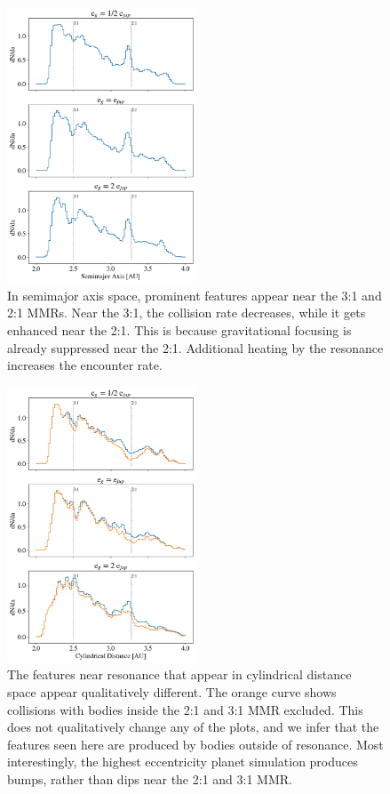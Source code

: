 \documentclass[onecolumn]{aastex63}
\begin{document}
\begin{figure}
\begin{center}
    \includegraphics[width=0.5\textwidth]{figures/coll_hist_a.png}
    \caption{In semimajor axis space, prominent features appear near the 3:1 and 2:1 MMRs. Near the 3:1, the collision
    rate decreases, while it gets enhanced near the 2:1. This is because gravitational focusing is already suppressed
    near the 2:1. Additional heating by the resonance increases the encounter rate.\label{fig:coll_hist_a}}
\end{center}
\end{figure}

\begin{figure}
\begin{center}
    \includegraphics[width=0.5\textwidth]{figures/coll_hist_r.png}
    \caption{The features near resonance that appear in cylindrical distance space appear qualitatively different.
    The orange curve shows collisions with bodies inside the 2:1 and 3:1 MMR excluded. This does not qualitatively
    change any of the plots, and we infer that the features seen here are produced by bodies outside of resonance.
    Most interestingly,  the highest eccentricity planet simulation produces bumps, rather than dips near the 2:1 and
    3:1 MMR.\label{fig:coll_hist_r}}
\end{center}
\end{figure}
\end{document}
